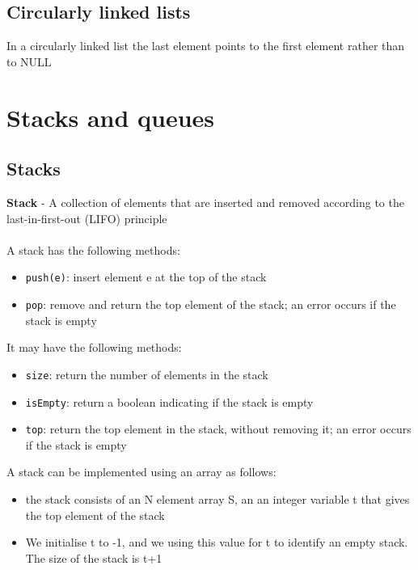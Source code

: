 \documentclass{article}[18pt]
\begin{document}
\subsection{Circularly linked lists}
In a circularly linked list the last element points to the first element rather than to NULL
\section{Stacks and queues}
\subsection{Stacks}
\textbf{Stack} - A collection of elements that are inserted and removed according to the last-in-first-out (LIFO) principle\\
\\
A stack has the following methods:
\begin{itemize}
	\item \texttt{push(e)}: insert element e at the top of the stack
	\item \texttt{pop}: remove and return the top element of the stack; an error occurs if the stack is empty
\end{itemize}
It may have the following methods:
\begin{itemize}
	\item \texttt{size}: return the number of elements in the stack
	\item \texttt{isEmpty}: return a boolean indicating if the stack is empty
	\item \texttt{top}: return the top element in the stack, without removing it; an error occurs if the stack is empty
\end{itemize}
A stack can be implemented using an array as follows:
\begin{itemize}
	\item the stack consists of an N element array S, an an integer variable t that gives the top element of the stack
	\item We initialise t to -1, and we using this value for t to identify an empty stack. The size of the stack is t+1
\end{itemize}
\end{document}
